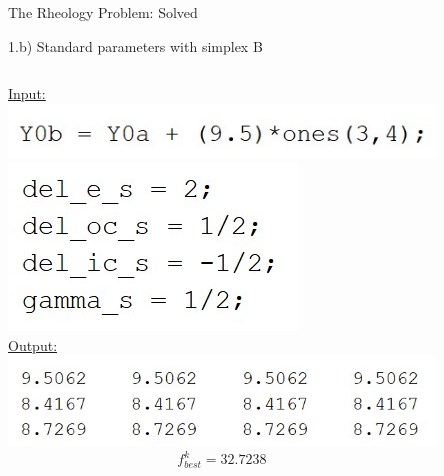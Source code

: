 \documentclass{beamer}
\begin{document}
\begin{frame}{The Rheology Problem: Solved}
\begin{block}{1.b) Standard parameters with simplex B}
\begin{columns}
\begin{column}{0.35\linewidth}
	\underline{Input:}\\
	\includegraphics[width=0.75\linewidth]{Y0b}\\
	\includegraphics[width=0.45\linewidth]{StandardParams}\\
	\vspace{0.65cm}
	\underline{Output:}\\
	\includegraphics[width=0.95\linewidth]{1bSimplex}
	$$f^k_{best} = 32.7238$$
	\vspace{0.1cm}
\end{column}
\begin{column}{0.63\linewidth}
	\begin{figure}
	\end{figure}	
\end{column}
\end{columns}
\end{block}
\end{frame}
\end{document}
